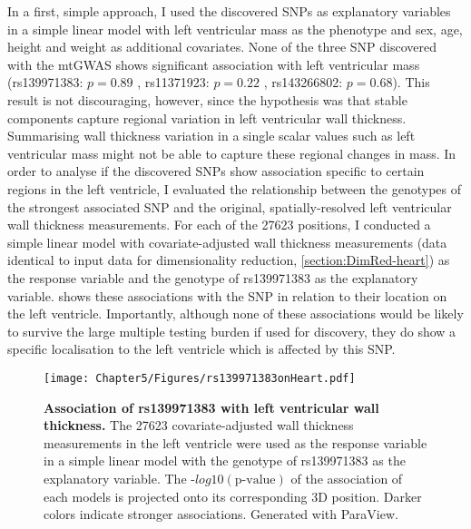 In a first, simple approach, I used the discovered SNPs as explanatory variables in a simple linear model with left ventricular mass as the phenotype and sex, age, height and weight as additional covariates. None of the three SNP discovered with the mtGWAS shows significant association with left ventricular mass (rs139971383: \(p=0.89\) , rs11371923: \(p=0.22\) , rs143266802: \(p=0.68\)). This result is not discouraging, however, since the hypothesis was that stable components capture regional variation in left ventricular wall thickness. Summarising wall thickness variation in a single scalar values such as left ventricular mass might not be able to capture these regional changes in mass. In order to analyse if the discovered SNPs show association specific to certain regions in the left ventricle, I evaluated the relationship between the genotypes of the strongest associated SNP and the original, spatially-resolved left ventricular wall thickness measurements. 
For each of the \num{27623} positions, I conducted a simple linear model with covariate-adjusted wall thickness measurements (data identical to input data for dimensionality reduction, \cref{section:DimRed-heart}) as the response variable and the genotype of rs139971383 as the explanatory variable.  shows these associations with the SNP in relation to their location on the left ventricle. Importantly, although none of these associations would be likely to survive the large multiple testing burden if used for discovery, they do show a specific localisation to the left ventricle which is affected by this SNP.

\begin{figure}[hbtp]
	\centering
	\texttt{[image: Chapter5/Figures/rs139971383onHeart.pdf]}
	\caption[\textbf{Association of  rs139971383 with left ventricular wall thickness. }]{\textbf{Association of rs139971383 with left ventricular wall thickness. }The \num{27623} covariate-adjusted wall thickness measurements in the left ventricle were used as the response variable in a simple linear model with the genotype of rs139971383 as the explanatory variable. The -\(log10(\text{p-value})\) of the association of each models is projected onto its corresponding 3D position. Darker colors indicate stronger associations. Generated with ParaView. } 
	 	\label{fig:wall-heart}
\end{figure}


